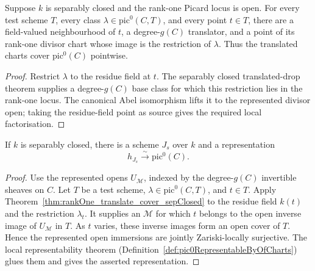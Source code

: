 \begin{theorem}
  \label{thm:rankOne_translate_cover_sepClosed}
  \leanok
  Suppose \(k\) is separably closed and the rank-one Picard locus is open.  For every test
  scheme \(T\), every class \(\lambda\in\mathrm{pic}^0(C,T)\), and every point \(t\in T\),
  there are a field-valued neighbourhood of \(t\), a degree-\(g(C)\) translator, and a point
  of its rank-one divisor chart whose image is the restriction of \(\lambda\).  Thus the
  translated charts cover \(\mathrm{pic}^0(C)\) pointwise.
\end{theorem}
\begin{proof}
  \leanok
  Restrict \(\lambda\) to the residue field at \(t\).  The separably closed translated-drop
  theorem supplies a degree-\(g(C)\) base class for which this restriction lies in the
  rank-one locus.  The canonical Abel isomorphism lifts it to the represented divisor open;
  taking the residue-field point as source gives the required local factorisation.
\end{proof}

\begin{definition}
  \label{def:pic0_sepClosed_representableBy}
  \leanok
  If \(k\) is separably closed, there is a scheme \(J_s\) over \(k\) and a representation
  \[
    h_{J_s}\xrightarrow{\ \sim\ }\mathrm{pic}^0(C).
  \]
\end{definition}
\begin{proof}
  \leanok
  Use the represented opens \(U_{\mathcal M}\), indexed by the degree-\(g(C)\) invertible
  sheaves on \(C\).  Let \(T\) be a test scheme, \(\lambda\in\mathrm{pic}^0(C,T)\), and
  \(t\in T\).  Apply Theorem~\ref{thm:rankOne_translate_cover_sepClosed} to the residue field
  \(k(t)\) and the restriction \(\lambda_t\).  It supplies an \(\mathcal M\) for which \(t\)
  belongs to the open inverse image of \(U_{\mathcal M}\) in \(T\).  As \(t\) varies, these
  inverse images form an open cover of \(T\).  Hence the represented open immersions are
  jointly Zariski-locally surjective.  The local representability theorem
  (Definition~\ref{def:pic0RepresentableByOfCharts}) glues them and gives the asserted
  representation.
\end{proof}

